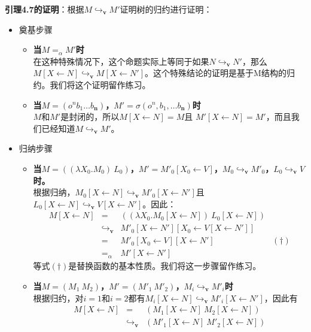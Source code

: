 \documentclass{book}
\def\v{\mathbf{v}}
\begin{document}
\begin{adjustwidth}{20pt}{20pt}
\textbf{引理4.7的证明}：根据$M\hookrightarrow_{\mathbf{v}}M'$证明树的归约进行证明：
\begin{itemize}
 \item 奠基步骤
 \begin{itemize}
  \item \textbf{当$M=_\alpha M'$时}\\
  在这种特殊情况下，这个命题实际上等同于如果$N\hookrightarrow_{\mathbf{v}} N'$，那么$M[X\leftarrow N]\hookrightarrow_{\mathbf{v}} M[X\leftarrow N']$。这个特殊结论的证明是基于M结构的归约。我们将这个证明留作练习。
  \item \textbf{当$M=(o^n b_1\ldots b_\textbf{n})$，$M'=\sigma(o^n,b_1,\ldots b_\textbf{n})$时}\\
  $M$和$M'$是封闭的，所以$M[X\leftarrow N]=M$且 $M'[X\leftarrow N]=M'$，而且我们已经知道$M\hookrightarrow_{\mathbf{v}} M'$。
 \end{itemize}
 \item 归纳步骤
 \begin{itemize}
  \item \textbf{当$M=((\lambda X_0.M_0)\ L_0)$，$M'=M'_0[X_0\leftarrow V]$，$M_0\hookrightarrow_{\mathbf{v}} M'_0$，$L_0\hookrightarrow_{\mathbf{v}} V$时。}\\
  根据归纳，$M_0[X\leftarrow N]\hookrightarrow_{\mathbf{v}} M'_0[X\leftarrow N']$且$L_0[X\leftarrow N]\hookrightarrow_{\mathbf{v}} V[X\leftarrow N']$。因此：
  $$
  \begin{array}{lcll}
   M[X\leftarrow N] &= & ((\lambda X_0.M_0[X\leftarrow N])\ L_0[X\leftarrow N]) \\
   &\hookrightarrow_{\mathbf{v}} & M'_0[X\leftarrow N'][X_0\leftarrow V[X\leftarrow N']] \\
   &=& M'_0[X_0\leftarrow V][X\leftarrow N'] & (\dagger)\\
   &=_\alpha&M'[X\leftarrow N']
  \end{array}
  $$
  等式$(\dagger)$是替换函数的基本性质。我们将这一步骤留作练习。
  \item \textbf{当$M=(M_1\ M_2)$，$M'=(M'_1\ M'_2)$，$M_i\hookrightarrow_{\mathbf{v}} M'_i$时}\\
  根据归约，对$i=1$和$i=2$都有$M_i[X\leftarrow N]\hookrightarrow_\v M'_i [X\leftarrow N']$，因此有\\
  $$
  \begin{array}{lcl}
   M[X\leftarrow N] & = & (M_1[X\leftarrow N]\ M_2[X\leftarrow N])\\
   & \hookrightarrow_{\mathbf{v}} &(M'_1[X\leftarrow N]\ M'_2[X\leftarrow N])\\

\end{array}$$
\end{itemize}
\end{itemize}
\end{adjustwidth}
\end{document}

